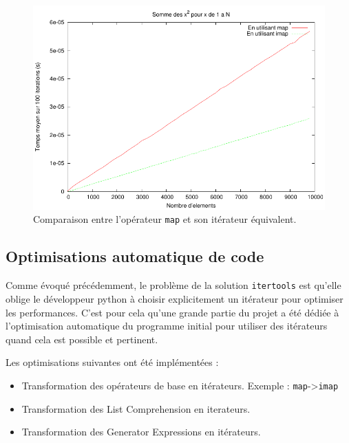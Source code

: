 \documentclass[a4paper]{article}
\begin{document}
\begin{figure}[h!]
  \includegraphics[width=\textwidth]{MapImap}
  \caption{Comparaison entre l'opérateur \texttt{map} et son itérateur équivalent.}
\end{figure}


\subsection*{Optimisations automatique de code}

Comme évoqué précédemment, le problème de la solution \texttt{itertools} est
qu'elle oblige le développeur python à choisir explicitement un
itérateur pour optimiser les performances. C'est pour cela qu'une
grande partie du projet a été dédiée à l'optimisation automatique du
programme initial pour utiliser des itérateurs quand cela est possible
et pertinent.

\vspace{.5em}

Les optimisations suivantes ont été implémentées :

\begin{itemize}
\item Transformation des opérateurs de base en itérateurs. Exemple :
  \texttt{map}->\texttt{imap}
\item Transformation des List Comprehension en iterateurs.
\item Transformation des Generator Expressions en itérateurs.
\end{itemize}

\vspace{.5em}
\end{document}
